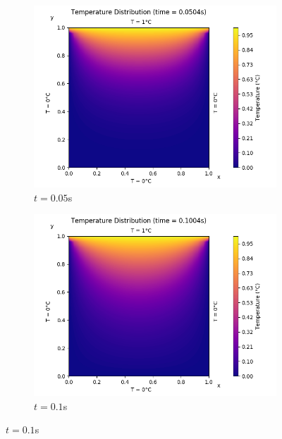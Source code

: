\documentclass[a4paper]{article}
\begin{document}
\begin{figure}[H]
			\medskip
			\begin{subfigure}{0.48\textwidth}
				\includegraphics[width=\linewidth]{figures/1a_implicit/3)t=50ms.png}
				\caption{$t = 0.05$s}
			\end{subfigure}\hspace*{\fill}
			\begin{subfigure}{0.48\textwidth}
				\includegraphics[width=\linewidth]{figures/1a_implicit/4)t=100ms.png}
				\caption{$t = 0.1$s}
			\end{subfigure}
			

\end{figure}
\end{document}
